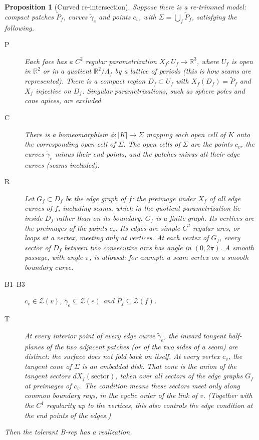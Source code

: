 \documentclass[preprint,12pt]{elsarticle}
\newtheorem{proposition}[theorem]{Proposition}
\theoremstyle{definition}
\theoremstyle{remark}
\newcommand{\R}{\mathbb{R}}
\newcommand{\Z}{\mathcal{Z}}
\begin{document}
\begin{proposition}[Curved re-intersection]\label{prop:Bprime}
Suppose there is a \emph{re-trimmed model}: compact patches $\tilde P_f$, curves $\tilde\gamma_e$ and points $c_v$, with
$\Sigma=\bigcup_f\tilde P_f$, satisfying the following.
\begin{description}
\item[P] Each face has a $C^2$ regular parametrization $X_f\colon U_f\to\R^3$, where $U_f$ is open in $\R^2$ or in a
quotient $\R^2/\Lambda_f$ by a lattice of periods (this is how seams are represented). There is a compact region
$D_f\subset U_f$ with $X_f(D_f)=\tilde P_f$ and $X_f$ injective on $D_f$. Singular parametrizations, such as sphere
poles and cone apices, are excluded.
\item[C] There is a homeomorphism $\phi\colon|K|\to\Sigma$ mapping each open cell of $K$ onto the corresponding open cell
of $\Sigma$. The open cells of $\Sigma$ are the points $c_v$, the curves $\tilde\gamma_e$ minus their end points, and the
patches minus all their edge curves (seams included).
\item[R] Let $G_f\subset D_f$ be the \emph{edge graph} of $f$: the preimage under $X_f$ of all edge curves of $f$,
including seams, which in the quotient parametrization lie inside $D_f$ rather than on its boundary. $G_f$ is a finite
graph. Its vertices are the preimages of the points $c_v$. Its edges are simple $C^2$ regular arcs, or loops at a
vertex, meeting only at vertices. At each vertex of $G_f$, every sector of $D_f$ between two consecutive arcs has angle
in $(0,2\pi)$. A smooth passage, with angle $\pi$, is allowed: for example a seam vertex on a smooth boundary curve.
\item[B1--B3] $c_v\in\Z(v)$, $\tilde\gamma_e\subseteq\Z(e)$ and $\tilde P_f\subseteq\Z(f)$.
\item[T] At every interior point of every edge curve $\tilde\gamma_e$, the inward tangent half-planes of the two adjacent
patches (or of the two sides of a seam) are distinct: the surface does not fold back on itself. At every vertex $c_v$,
the tangent cone of $\Sigma$ is an embedded disk. That cone is the union of the tangent sectors $dX_f(\text{sector})$,
taken over all sectors of the edge graphs $G_f$ at preimages of $c_v$. The condition means these sectors meet only along
common boundary rays, in the cyclic order of the link of $v$. (Together with the $C^1$ regularity up to the vertices,
this also controls the edge condition at the end points of the edges.)
\end{description}
Then the tolerant B-rep has a realization.
\end{proposition}
\end{document}
